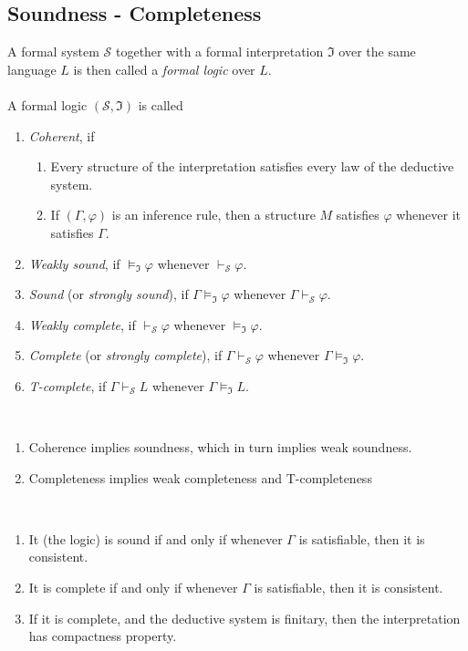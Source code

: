 \documentclass{treatise}
\begin{document}
\begin{shaded}
\section{Soundness - Completeness}
A formal system $\mathcal{S}$ together with a formal interpretation $\mathfrak{I}$ over the same language $L$ is then called a \emph{formal logic} over $L$.
\\
\\
A formal logic $(\mathcal{S}, \mathfrak{I})$ is called
\begin{enumerate}
    \item \emph{Coherent}, if
    \begin{enumerate}
        \item Every structure of the interpretation satisfies every law of the deductive system.
        \item If $(\Gamma, \varphi)$ is an inference rule, then a structure $M$ satisfies $\varphi$ whenever it satisfies $\Gamma$.
    \end{enumerate}
    \item \emph{Weakly sound}, if $\vDash_{\mathfrak{I}} \varphi$ whenever $\vdash_{\mathcal{S}} \varphi$.
    \item \emph{Sound} (or \emph{strongly sound}), if $\Gamma \vDash_{\mathfrak{I}} \varphi$ whenever $\Gamma \vdash_{\mathcal{S}} \varphi$.
    \item \emph{Weakly complete}, if $\vdash_{\mathcal{S}} \varphi$ whenever $\vDash_{\mathfrak{I}} \varphi$.
    \item \emph{Complete} (or \emph{strongly complete}), if $\Gamma \vdash_{\mathcal{S}} \varphi$ whenever $\Gamma \vDash_{\mathfrak{I}} \varphi$.
    \item \emph{T-complete}, if $\Gamma \vdash_{\mathcal{S}} L$ whenever $\Gamma \vDash_{\mathfrak{I}} L$.
\end{enumerate}
\begin{proposition} \ 
\begin{enumerate}
    \item Coherence implies soundness, which in turn implies weak soundness.
    \item Completeness implies weak completeness and T-completeness
\end{enumerate}
\end{proposition}
\begin{proposition} \ 
\begin{enumerate}
    \item It (the logic) is sound if and only if whenever $\Gamma$ is satisfiable, then it is consistent.
    \item It is complete if and only if whenever $\Gamma$ is satisfiable, then it is consistent.
    \item If it is complete, and the deductive system is finitary, then the interpretation has compactness property.
\end{enumerate}
\end{proposition}


\end{shaded}
\end{document}
